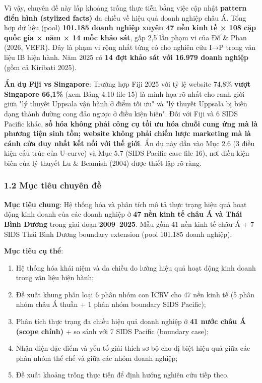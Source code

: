 \documentclass[12pt,a4paper]{article}
\providecommand{\tightlist}{\setlength{\itemsep}{0pt}\setlength{\parskip}{0pt}}
\begin{document}
Vì vậy, chuyên đề này lấp khoảng trống thực tiễn bằng việc cập nhật
\textbf{pattern điển hình (stylized facts)} đa chiều về hiệu quả doanh
nghiệp châu Á. Tổng hợp dữ liệu (pool) \textbf{101.185 doanh nghiệp
xuyên 47 nền kinh tế × 108 cặp quốc gia × năm × 14 mốc khảo sát}, gấp
2,5 lần phạm vi của Đỗ \& Phan (2026, VEFR). Đây là phạm vi rộng nhất
từng có cho nghiên cứu I→P trong văn liệu IB hiện hành. Năm 2025 có
\textbf{14 đợt khảo sát với 16.979 doanh nghiệp} (gồm cả Kiribati 2025).

\textbf{Ẩn dụ Fiji vs Singapore}: Trường hợp Fiji 2025 với tỷ lệ website
74,8\% \textbf{vượt Singapore 66,1\%} (xem Bảng 4.10 file 15) là minh
họa rõ nhất cho ranh giới giữa "lý thuyết Uppsala vận hành ở điểm tối
ưu" và "lý thuyết Uppsala bị biến dạng thành đường cong đảo ngược ở điều
kiện biên". Đối với Fiji và 6 SIDS Pacific khác, \textbf{số hóa không
phải công cụ tối ưu hóa chuỗi cung ứng mà là phương tiện sinh tồn;
website không phải chiến lược marketing mà là cánh cửa duy nhất kết nối
với thế giới}. Ẩn dụ này dẫn vào Mục 2.6 (3 điều kiện cấu trúc của
U-curve) và Mục 5.7 (SIDS Pacific case file 16), nơi điều kiện biên của
lý thuyết Lu \& Beamish (2004) được thiết lập rõ ràng.

\hypertarget{12-mux1ee5c-tiuxeau-chuyuxean-ux111ux1ec1}{%
\subsubsection{1.2 Mục tiêu chuyên
đề}\label{12-mux1ee5c-tiuxeau-chuyuxean-ux111ux1ec1}}

\textbf{Mục tiêu chung}: Hệ thống hóa và phân tích mô tả thực trạng hiệu
quả hoạt động kinh doanh của các doanh nghiệp ở \textbf{47 nền kinh tế
châu Á và Thái Bình Dương} trong giai đoạn \textbf{2009--2025}. Mẫu gồm
41 nền kinh tế châu Á + 7 SIDS Thái Bình Dương boundary extension (pool
101.185 doanh nghiệp).

\textbf{Mục tiêu cụ thể}:

\begin{enumerate}
\def\labelenumi{\arabic{enumi}.}
\tightlist
\item
  Hệ thống hóa khái niệm và đa chiều đo lường hiệu quả hoạt động kinh
  doanh trong văn liệu hiện hành;
\item
  Đề xuất khung phân loại 6 phân nhóm con ICRV cho 47 nền kinh tế (5
  phân nhóm châu Á thuần + 1 phân nhóm boundary SIDS Pacific);
\item
  Phân tích thực trạng đa chiều hiệu quả doanh nghiệp ở \textbf{41 nước
  châu Á (scope chính)} + so sánh với 7 SIDS Pacific (boundary case);
\item
  Nhận diện đặc điểm và yếu tố giải thích sơ bộ cho dị biệt hiệu quả
  giữa các phân nhóm thể chế và giữa các nhóm doanh nghiệp;
\item
  Đề xuất khoảng trống thực tiễn để định hướng nghiên cứu tiếp theo.
\end{enumerate}
\end{document}
